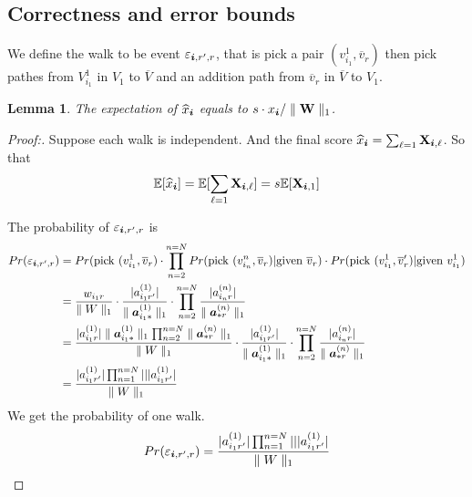 \documentclass{article}
\newcommand{\Sca}[3]{{#1}^{(#2)}_{i_#2#3}}%
\newcommand{\V}[1]{{\bm{{\MakeLowercase{#1}}}}}%
\newcommand{\VnC}[3]{\V{#1}^{(#2)}_{#3}}%
\newcommand{\M}[1]{{\bm{\mathbf{\MakeUppercase{#1}}}}}%
\newcommand{\norm}[2]{\parallel#1\parallel_{#2}}
\newtheorem{lemma}{Lemma}[section]
\begin{document}
\subsection{Correctness and error bounds}
We define the walk to be event $\varepsilon_{\V{i},r',r}$, that is pick a pair $(v^1_{i_1},\overline{v}_r)$ then pick pathes from $V^1_{i_1}$ in $V_1$ to $\overline{V}$ and  an addition path from $\overline{v}_r$ in $\overline{V}$ to $V_1$.

\begin{lemma}\label{lemma:Expectation}
The expectation of $\widehat{x}_{\V{i}}$ equals to $s\cdot x_{\V{i}}/\norm{\M{W}}{1}$.
\end{lemma}
\begin{proof}[Proof:]
Suppose each walk is independent. And the final score $\widehat{x}_{\V{i}} = \sum_{\ell=1}\M{X}_{\V{i},\ell}$. So that
\begin{equation}\label{eq:Expectation}
\mathbb{E}[\widehat{x}_{\V{i}}] = \mathbb{E}[\sum_{\ell=1}\M{X}_{\V{i},\ell}]=s\mathbb{E}[\M{X}_{\V{i},1}]
\end{equation}

The probability of $\varepsilon_{\V{i},r',r}$ is
\begin{align*}
Pr(\varepsilon_{\V{i},r',r})
&=Pr({\rm pick\ }(v^1_{i_1},\overline{v}_r)\cdot
\prod_{n=2}^{n=N}
Pr({\rm pick\ }(v^n_{i_n},\overline{v}_r)| {\rm given\ }\overline{v}_r)\cdot
Pr({\rm pick\ }(v^1_{i_1},\overline{v}_r')| {\rm given\ }v^1_{i_1})\\
&=\frac{w_{i_1r}}{\norm{W}{1}}\cdot
  \frac{|\Sca{a}{1}{r'}|}{\norm{{\VnC{a}{1}{i_1*}}}{1}}\cdot
  \prod_{n=2}^{n=N}
  \frac{|\Sca{a}{n}{r}|}{\norm{{\VnC{a}{n}{*r}}}{1}}\\
&=\frac{|\Sca{a}{1}{r}|\norm{{\VnC{a}{1}{i_1*}}}{1}\prod_{n=2}^{n=N}\norm{{\VnC{a}{n}{*r}}}{1}}{\norm{W}{1}}\cdot
  \frac{|\Sca{a}{1}{r'}|}{\norm{{\VnC{a}{1}{i_1*}}}{1}}\cdot
  \prod_{n=2}^{n=N}
  \frac{|\Sca{a}{n}{r}|}{\norm{{\VnC{a}{n}{*r}}}{1}}\\
&=\frac{|\Sca{a}{1}{r'}|\prod_{n=1}^{n=N}|||\Sca{a}{1}{r'}|}{\norm{W}{1}}
\end{align*}
We get the probability of one walk.
\begin{equation}\label{eq:ProbabilityOneWalk}
Pr(\varepsilon_{\V{i},r',r})=\frac{|\Sca{a}{1}{r'}|\prod_{n=1}^{n=N}|||\Sca{a}{1}{r'}|}{\norm{W}{1}}
\end{equation}


\end{proof}
\end{document}
